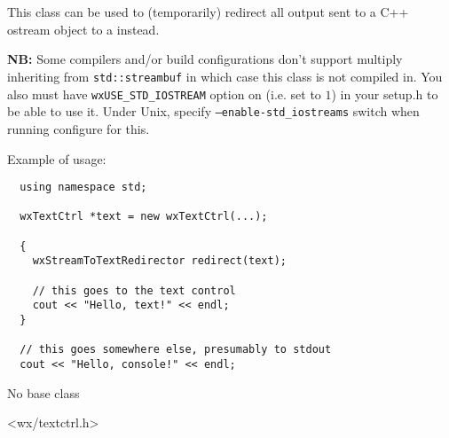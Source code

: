 
\section{}\label{wxstreamtotextredirector}

This class can be used to (temporarily) redirect all output sent to a C++
ostream object to a  instead.

{\bf NB:} Some compilers and/or build configurations don't support multiply
inheriting  from {\tt std::streambuf} in which
case this class is not compiled in. You also must have {\tt wxUSE\_STD\_IOSTREAM} 
option on (i.e. set to $1$) in your setup.h to be able to use it. Under Unix,
specify {\tt --enable-std\_iostreams} switch when running configure for this.

Example of usage:
{\small%
\begin{verbatim}
  using namespace std;

  wxTextCtrl *text = new wxTextCtrl(...);

  {
    wxStreamToTextRedirector redirect(text);

    // this goes to the text control
    cout << "Hello, text!" << endl;
  }

  // this goes somewhere else, presumably to stdout
  cout << "Hello, console!" << endl;
\end{verbatim}
}%


No base class


<wx/textctrl.h>






\label{wxstreamtotextredirectorctor}

